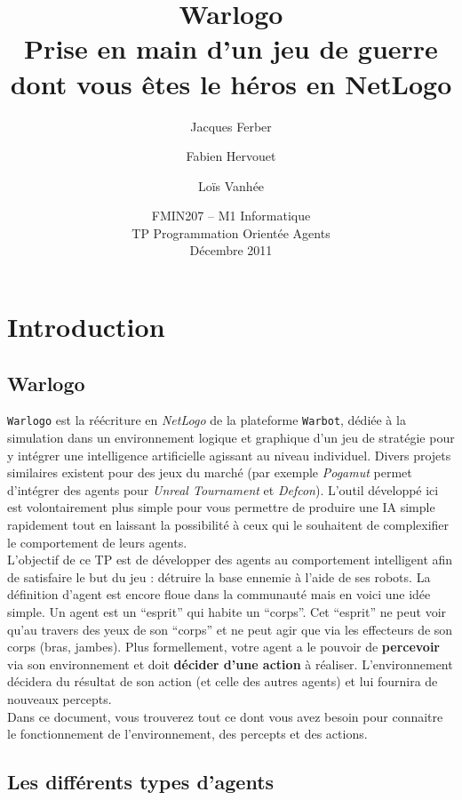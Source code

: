 \documentclass[a4paper,11pt]{article}
\title{{\sc Warlogo}\\{\small Prise en main d'un jeu de guerre dont vous êtes le héros en NetLogo}}
\author{Jacques Ferber \and Fabien Hervouet \and Loïs Vanhée}
\date{FMIN207 -- M1 Informatique\\TP Programmation Orientée Agents\\Décembre 2011}
\begin{document}
\maketitle



\section*{Introduction}

\subsection*{Warlogo}

\texttt{Warlogo} est la réécriture en \textit{NetLogo} de la plateforme \texttt{Warbot}, dédiée à la
simulation dans un environnement logique et graphique d'un jeu de stratégie pour y intégrer une
intelligence artificielle agissant au niveau individuel. Divers projets similaires existent pour des
jeux du marché (par exemple \textit{Pogamut} permet d'intégrer des agents  pour \textit{Unreal
Tournament} et \textit{Defcon}). L'outil développé ici est volontairement plus simple pour vous
permettre de produire une IA simple rapidement tout en laissant la possibilité à ceux qui le
souhaitent de complexifier le comportement de leurs agents.\\

L'objectif de ce TP est de développer des agents au comportement intelligent afin de satisfaire le
but du jeu : détruire la base ennemie à l'aide de ses robots. La définition d'agent est encore floue
dans la communauté mais en voici une idée simple. Un agent est un ``esprit'' qui habite un
``corps''.  Cet ``esprit'' ne peut voir qu'au travers des yeux de son ``corps'' et ne peut agir que
via les effecteurs de son corps (bras, jambes). Plus formellement, votre agent a le pouvoir de
\textbf{percevoir} via son environnement et doit \textbf{décider d'une action} à réaliser.
L'environnement décidera du résultat de son action (et celle des autres agents) et lui fournira de
nouveaux percepts.\\

Dans ce document, vous trouverez tout ce dont vous avez besoin pour connaitre le fonctionnement de
l'environnement, des percepts et des actions.

\subsection*{Les différents types d'agents}
\end{document}
